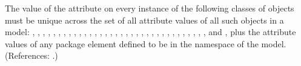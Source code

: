 The value of the attribute  on every instance of the following
classes of objects must be unique across the set of all 
attribute values of 
{all such objects in a model:
{
\AlgebraicRule,
\AssignmentRule,
\Compartment,
\Constraint,
\Delay,
\Event,
\EventAssignment,
\FunctionDefinition,
\InitialAssignment,
\KineticLaw,
\ListOfCompartments,
\ListOfConstraints,
\ListOfEventAssignments,
\ListOfEvents,
\ListOfFunctionDefinitions,
\ListOfInitialAssignments,
\ListOfLocalParameters,
\ListOfModifierSpeciesReferences,
\ListOfParameters,
\ListOfReactions,
\ListOfRules,
\ListOfSpecies,
\ListOfSpeciesReferences,
\ListOfUnitDefinitions,
\ListOfUnits,
\Model,
\ModifierSpeciesReference,
\Parameter,
\Priority,
\RateRule,
\Reaction,
\Species,
\SpeciesReference,
\Trigger, and
\Unit
}}, plus the  attribute values of any \sbmlthree package element defined to be in the  namespace of the model.
(References: .)
